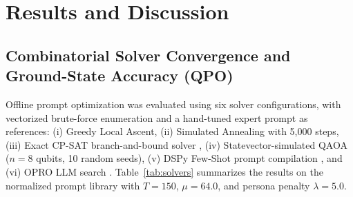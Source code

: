 \documentclass[review,12pt,times,authoryear]{elsarticle}
\theoremstyle{definition}
\begin{document}
\section{Results and Discussion}
\label{sec:results}

\subsection{Combinatorial Solver Convergence and Ground-State Accuracy (QPO)}
Offline prompt optimization was evaluated using six solver configurations, with vectorized brute-force enumeration and a hand-tuned expert prompt as references: (i) Greedy Local Ascent, (ii) Simulated Annealing with 5,000 steps, (iii) Exact CP-SAT branch-and-bound solver \citep{ortools2024}, (iv) Statevector-simulated QAOA ($n=8$ qubits, 10 random seeds), (v) DSPy Few-Shot prompt compilation \citep{Khattab2024}, and (vi) OPRO LLM search \citep{Yang2024}. Table~\ref{tab:solvers} summarizes the results on the normalized prompt library with $T=150$, $\mu=64.0$, and persona penalty $\lambda=5.0$.
\end{document}
